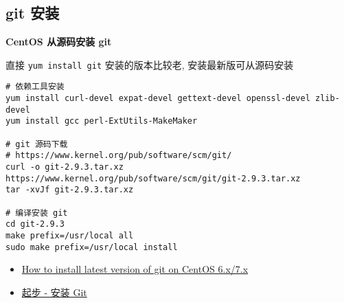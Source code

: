 \subsection{git 安装}\label{git-ux5b89ux88c5}

\textbf{CentOS 从源码安装 git}

直接 \texttt{yum\ install\ git} 安装的版本比较老, 安装最新版可从源码安装

\begin{verbatim}
# 依赖工具安装
yum install curl-devel expat-devel gettext-devel openssl-devel zlib-devel
yum install gcc perl-ExtUtils-MakeMaker

# git 源码下载
# https://www.kernel.org/pub/software/scm/git/
curl -o git-2.9.3.tar.xz https://www.kernel.org/pub/software/scm/git/git-2.9.3.tar.xz
tar -xvJf git-2.9.3.tar.xz

# 编译安装 git
cd git-2.9.3
make prefix=/usr/local all
sudo make prefix=/usr/local install
\end{verbatim}

\begin{itemize}
\tightlist
\item
  \href{http://stackoverflow.com/questions/21820715/how-to-install-latest-version-of-git-on-centos-6-x-7-x}{How
  to install latest version of git on CentOS 6.x/7.x}
\item
  \href{https://git-scm.com/book/zh/v1/\%E8\%B5\%B7\%E6\%AD\%A5-\%E5\%AE\%89\%E8\%A3\%85-Git}{起步
  - 安装 Git}
\end{itemize}

